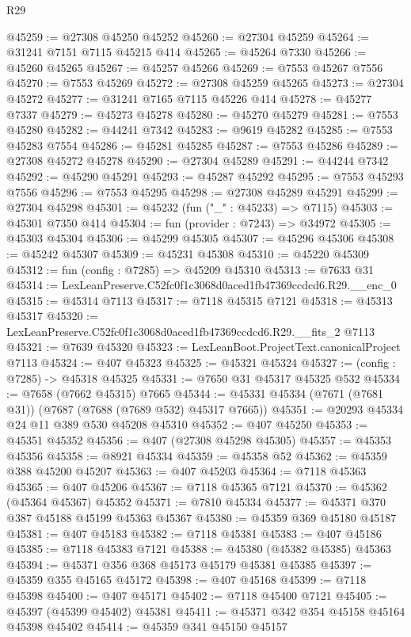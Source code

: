 \begin{lexlean}{R29}
\begin{coremodule}
@45259 := @27308 @45250 @45252
@45260 := @27304 @45259
@45264 := @31241 @7151 @7115 @45215 @414
@45265 := @45264 @7330
@45266 := @45260 @45265
@45267 := @45257 @45266
@45269 := @7553 @45267 @7556
@45270 := @7553 @45269
@45272 := @27308 @45259 @45265
@45273 := @27304 @45272
@45277 := @31241 @7165 @7115 @45226 @414
@45278 := @45277 @7337
@45279 := @45273 @45278
@45280 := @45270 @45279
@45281 := @7553 @45280
@45282 := @44241 @7342
@45283 := @9619 @45282
@45285 := @7553 @45283 @7554
@45286 := @45281 @45285
@45287 := @7553 @45286
@45289 := @27308 @45272 @45278
@45290 := @27304 @45289
@45291 := @44244 @7342
@45292 := @45290 @45291
@45293 := @45287 @45292
@45295 := @7553 @45293 @7556
@45296 := @7553 @45295
@45298 := @27308 @45289 @45291
@45299 := @27304 @45298
@45301 := @45232 (fun ("_" : @45233) => @7115)
@45303 := @45301 @7350 @414
@45304 := fun (provider : @7243) => @34972
@45305 := @45303 @45304
@45306 := @45299 @45305
@45307 := @45296 @45306
@45308 := @45242 @45307
@45309 := @45231 @45308
@45310 := @45220 @45309
@45312 := fun (config : @7285) => @45209 @45310
@45313 := @7633 @31
@45314 := LexLeanPreserve.C52fc0f1c3068d0aced1fb47369ccdcd6.R29.__enc_0
@45315 := @45314 @7113
@45317 := @7118 @45315 @7121
@45318 := @45313 @45317
@45320 := LexLeanPreserve.C52fc0f1c3068d0aced1fb47369ccdcd6.R29.__fits_2 @7113
@45321 := @7639 @45320
@45323 := LexLeanBoot.ProjectText.canonicalProject @7113
@45324 := @407 @45323
@45325 := @45321 @45324
@45327 := (config : @7285) -> @45318 @45325
@45331 := @7650 @31 @45317 @45325 @532
@45334 := @7658 (@7662 @45315) @7665
@45344 := @45331 @45334 (@7671 (@7681 @31)) (@7687 (@7688 (@7689 @532) @45317 @7665))
@45351 := @20293 @45334 @24 @11 @389 @530 @45208 @45310
@45352 := @407 @45250
@45353 := @45351 @45352
@45356 := @407 (@27308 @45298 @45305)
@45357 := @45353 @45356
@45358 := @8921 @45334
@45359 := @45358 @52
@45362 := @45359 @388 @45200 @45207
@45363 := @407 @45203
@45364 := @7118 @45363
@45365 := @407 @45206
@45367 := @7118 @45365 @7121
@45370 := @45362 (@45364 @45367) @45352
@45371 := @7810 @45334
@45377 := @45371 @370 @387 @45188 @45199 @45363 @45367
@45380 := @45359 @369 @45180 @45187
@45381 := @407 @45183
@45382 := @7118 @45381
@45383 := @407 @45186
@45385 := @7118 @45383 @7121
@45388 := @45380 (@45382 @45385) @45363
@45394 := @45371 @356 @368 @45173 @45179 @45381 @45385
@45397 := @45359 @355 @45165 @45172
@45398 := @407 @45168
@45399 := @7118 @45398
@45400 := @407 @45171
@45402 := @7118 @45400 @7121
@45405 := @45397 (@45399 @45402) @45381
@45411 := @45371 @342 @354 @45158 @45164 @45398 @45402
@45414 := @45359 @341 @45150 @45157

\end{coremodule}
\end{lexlean}
